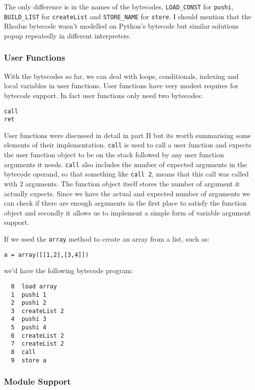 The only difference is in the names of the bytecodes, {\tt LOAD\_CONST} for {\tt pushi}, {\tt BUILD\_LIST} for {\tt createList} and {\tt STORE\_NAME} for {\tt store}. I should mention that the Rhodus bytecode wasn't modelled on Python's bytecode but similar solutions popup repeatedly in different interpreters.

\subsubsection*{User Functions}

With the bytecodes so far, we can deal with loops, conditionals, indexing and local variables in user functions. User functions have very modest requires for bytecode support. In fact user functions only need two bytecodes:

\begin{lstlisting}
call
ret
\end{lstlisting}

User functions were discussed in detail in part II but its worth summarising some elements of their implementation. {\tt call} is used to call a user function and expects the user function object to be on the stack followed by any user function arguments it needs. {\tt call} also includes the number of expected arguments in the bytecode operand, so that something like {\tt call 2}, means that this call was called with 2 arguments. The function object itself stores the number of argument it actually expects. Since we have the actual and expected number of arguments we can check if there are enough arguments in the first place to satisfy the function object and secondly it allows us to implement a simple form of variable argument support.

If we used the {\tt array} method to create an array from a list, such as:

\begin{lstlisting}
a = array([[1,2],[3,4]])
\end{lstlisting}

we'd have the following bytecode program:

\begin{lstlisting}
  0  load array
  1  pushi 1
  2  pushi 2
  3  createList 2
  4  pushi 3
  5  pushi 4
  6  createList 2
  7  createList 2
  8  call
  9  store a
\end{lstlisting}

\subsubsection*{Module Support}

